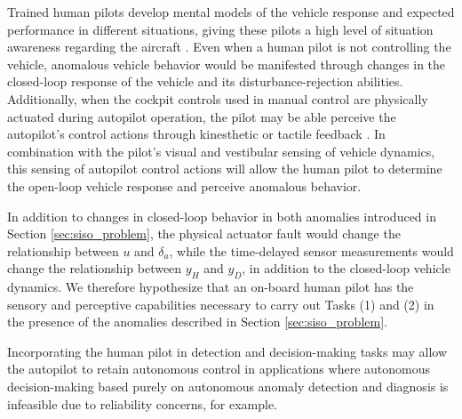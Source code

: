 Trained human pilots develop mental models of the vehicle response and expected performance in different situations, giving these pilots a high level of situation awareness regarding the aircraft \cite{endsley1995toward}. Even when a human pilot is not controlling the vehicle, anomalous vehicle behavior would be manifested through changes in the closed-loop response of the vehicle and its disturbance-rejection abilities. Additionally, when the cockpit controls used in manual control are physically actuated during autopilot operation, the pilot may be able perceive the autopilot's control actions through kinesthetic or tactile feedback \cite{tan1994human, yang2007development}. In combination with the pilot's visual and vestibular sensing of vehicle dynamics, this sensing of autopilot control actions will allow the human pilot to determine the open-loop vehicle response and perceive anomalous behavior. 

In addition to changes in closed-loop behavior in both anomalies introduced in Section \ref{sec:siso_problem}, the physical actuator fault would change the relationship between $u$ and $\delta_a$, while the time-delayed sensor measurements would change the relationship between $y_{H}$ and $y_{D}$, in addition to the closed-loop vehicle dynamics. We therefore hypothesize that an on-board human pilot has the sensory and perceptive capabilities necessary to carry out Tasks (1) and (2) in the presence of the anomalies described in Section \ref{sec:siso_problem}. 

Incorporating the human pilot in detection and decision-making tasks may allow the autopilot to retain autonomous control in applications where autonomous decision-making based purely on autonomous anomaly detection and diagnosis is infeasible due to reliability concerns, for example. 



